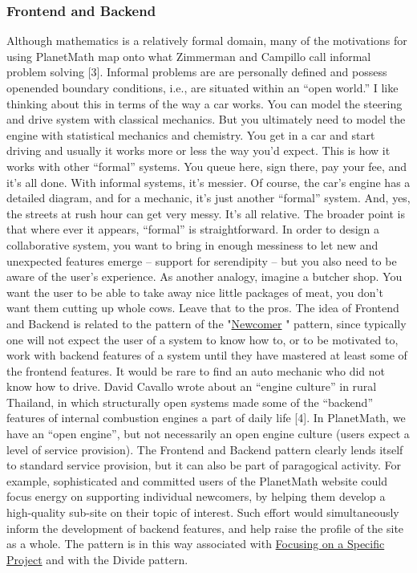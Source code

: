 \subsubsection{Frontend and Backend}

Although mathematics is a relatively formal domain, many of the
motivations for using PlanetMath map onto what Zimmerman and Campillo
call informal problem solving {[}3{]}. Informal problems are are
personally defined and possess openended boundary conditions, i.e., are
situated within an ``open world.'' I like thinking about this in terms
of the way a car works. You can model the steering and drive system with
classical mechanics. But you ultimately need to model the engine with
statistical mechanics and chemistry. You get in a car and start driving
and usually it works more or less the way you'd expect. This is how it
works with other ``formal'' systems. You queue here, sign there, pay
your fee, and it's all done. With informal systems, it's messier. Of
course, the car's engine has a detailed diagram, and for a mechanic,
it's just another ``formal'' system. And, yes, the streets at rush hour
can get very messy. It's all relative. The broader point is that where
ever it appears, ``formal'' is straightforward. In order to design a
collaborative system, you want to bring in enough messiness to let new
and unexpected features emerge -- support for serendipity -- but you
also need to be aware of the user's experience. As another analogy,
imagine a butcher shop. You want the user to be able to take away nice
little packages of meat, you don't want them cutting up whole cows.
Leave that to the pros. The idea of Frontend and Backend is related to
the pattern of the
"\href{http://peeragogy.org/practice/newcomer/}{Newcomer} " pattern,
since typically one will not expect the user of a system to know how to,
or to be motivated to, work with backend features of a system until they
have mastered at least some of the frontend features. It would be rare
to find an auto mechanic who did not know how to drive. David Cavallo
wrote about an ``engine culture'' in rural Thailand, in which
structurally open systems made some of the ``backend'' features of
internal combustion engines a part of daily life {[}4{]}. In PlanetMath,
we have an ``open engine'', but not necessarily an open engine culture
(users expect a level of service provision). The Frontend and Backend
pattern clearly lends itself to standard service provision, but it can
also be part of paragogical activity. For example, sophisticated and
committed users of the PlanetMath website could focus energy on
supporting individual newcomers, by helping them develop a high-quality
sub-site on their topic of interest. Such effort would simultaneously
inform the development of backend features, and help raise the profile
of the site as a whole. The pattern is in this way associated with
\href{http://peeragogy.org/practice/focusing-on-a-specific-project/}{Focusing
on a Specific Project} and with the Divide pattern.


